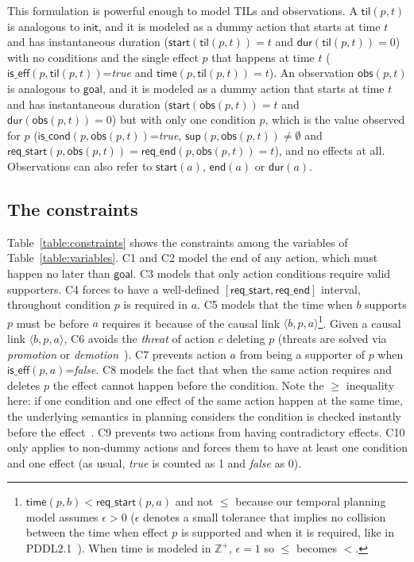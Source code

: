 \documentclass{ecai}
\newcommand{\tup}[1]{{\langle #1 \rangle}}
\newcommand{\dur}{\mathsf{dur}}    %
\newcommand{\iscond}{\mathsf{is\_cond}}    %
\newcommand{\iseff}{\mathsf{is\_eff}}    %
\newcommand{\obs}{\mathsf{obs}}    %
\newcommand{\start}{\mathsf{start}}%
\newcommand{\en}{\mathsf{end}}     %
\newcommand{\til}{\mathsf{til}}    %
\newcommand{\supp}{\mathsf{sup}}   %
\newcommand{\tim}{\mathsf{time}}   %
\newcommand{\reqs}{\mathsf{req\_{start}}} %
\newcommand{\reqe}{\mathsf{req\_{end}}}   %
\newcommand{\ini}{\mathsf{init}}   %
\newcommand{\goal}{\mathsf{goal}}  %
\begin{document}
This formulation is powerful enough to model TILs and observations. A $\til(p,t)$ is analogous to $\ini$, and it is
modeled as a dummy action that starts at time $t$ and has instantaneous duration ($\start(\til(p,t))=t$ and $\dur(\til(p,t))=0$) with no conditions and the single effect $p$ that happens at time $t$ ($\iseff(p,\til(p,t))$=\textit{true} and $\tim(p,\til(p,t))=t$). 
An observation $\obs(p,t)$ is analogous to $\goal$, and it 
is modeled as a dummy action that starts at time $t$ and has instantaneous duration ($\start(\obs(p,t))=t$ and $\dur(\obs(p,t))=0$) but with only one condition $p$, which is the value observed for $p$ ($\iscond(p,\obs(p,t))$=\textit{true}, $\supp(p,\obs(p,t))\neq \emptyset$ and $\reqs(p,\obs(p,t))=\reqe(p,\obs(p,t))=t$), and no effects at all. Observations can also refer to $\start(a)$, $\en(a)$ or $\dur(a)$.




\subsection{The constraints}
\label{section:CSPconstraints}

Table~\ref{table:constraints} shows the constraints among the variables of Table~\ref{table:variables}. C1 and C2
model the end of any action, which must happen no later than $\goal$. 
C3 models that only action conditions require valid supporters.
C4 forces to have a well-defined $[\reqs,\reqe]$ interval, throughout condition $p$ is required in $a$.
C5 models that the time when $b$ supports $p$ must be before $a$ requires it because of the causal link $\tup{b,p,a}$\footnote{$\tim(p,b) < \reqs(p,a)$ and not $\leq$ because our temporal planning model assumes $\epsilon > 0$ ($\epsilon$ denotes a small tolerance that implies no collision between the time when effect $p$ is supported and when it is required, like in PDDL2.1~\cite{fox2003pddl2}). When time is modeled in $\mathbb{Z}^+$, $\epsilon=1$ so $\leq$ becomes $<$.}. 
Given a causal link $\tup{b,p,a}$, C6 avoids the {\em threat} of action $c$ deleting $p$ (threats are solved via {\em promotion} or {\em demotion}~\cite{ghallab2004automated}). 
C7 prevents action $a$ from being a supporter of $p$ when $\iseff(p,a)$=\textit{false}. 
C8 models the fact that when the same action requires and deletes $p$ the effect cannot happen before the condition. Note the $\geq$ inequality here: if one condition and one effect of the same action happen at the same time, the underlying semantics in planning considers the condition is checked instantly before the effect~\cite{fox2003pddl2}. 
C9 prevents two actions from having contradictory effects. 
C10 only applies to non-dummy actions and forces them to have at least one condition and one effect (as usual, \textit{true} is counted as 1 and \textit{false} as 0).
\end{document}
